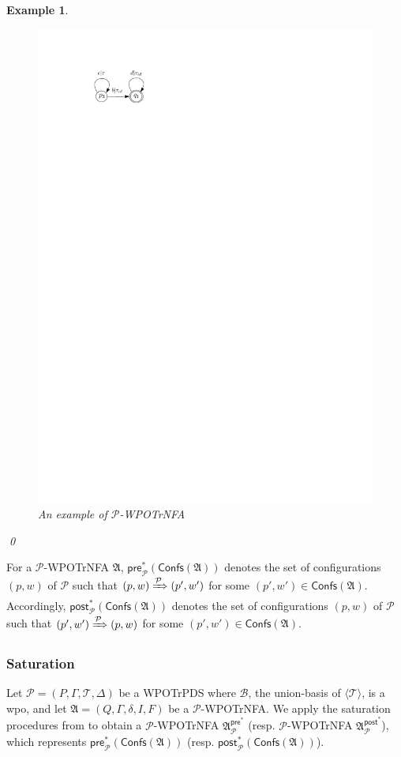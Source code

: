 \documentclass[preprint,12pt]{elsarticle}
\newtheorem{example}{Example}
\newcommand\Pp{{\mathcal{P} }}
\newcommand\confs{{\mathsf{Confs} }}
\newcommand\pre{{\mathsf{pre} }}
\newcommand\post{{\mathsf{post} }}
\newcommand\Aut{{\mathfrak{A} }}
\newcommand\TranSet{{\mathscr{T} }}
\newcommand\Tranbasis{{\mathscr{B} }}
\newcommand{\WOTrPDS}{\textsf{WPOTrPDS}}
\newcommand{\WOTrNFA}{\textsf{WPOTrNFA}}
\begin{document}
\begin{example}
\begin{figure}[htb]
	\includegraphics[scale = 0.9]{pwpotrnfa-example.pdf}
	\caption{An example of $\Pp$-\WOTrNFA}\label{fig-ptrnfa-exmp}
\end{figure}
\qed
\end{example}

For a $\Pp$-{\WOTrNFA} $\Aut$, $\pre^*_\Pp(\confs(\Aut))$  denotes the set of configurations $(p, w)$ of $\Pp$ such that $(p, w) \xRightarrow{\Pp} (p', w')$ for some $(p', w') \in \confs(\Aut)$. Accordingly, $\post^*_\Pp(\confs(\Aut))$ denotes the set of configurations $(p, w)$ of $\Pp$ such that $(p', w') \xRightarrow{\Pp} (p, w)$ for some $(p', w') \in \confs(\Aut)$.





\subsubsection{Saturation} \label{sect:decidability}
Let $\Pp = (P, \Gamma, \TranSet, \Delta)$ be a  {\WOTrPDS} where $\Tranbasis$, the union-basis of  $\langle \TranSet \rangle$, is a wpo, and let $\Aut = (Q, \Gamma, \delta, I, F)$ be a $\Pp$-{\WOTrNFA}. %
We apply the saturation procedures from \cite{SM+15,Song18} to obtain a $\Pp$-{\WOTrNFA} $\Aut^{\pre^*}_{\Pp}$ (resp. $\Pp$-{\WOTrNFA} $\Aut^{\post^*}_{\Pp}$), which represents $\pre^*_\Pp(\confs(\Aut))$ (resp. $\post^*_\Pp(\confs(\Aut))$).
\end{document}
